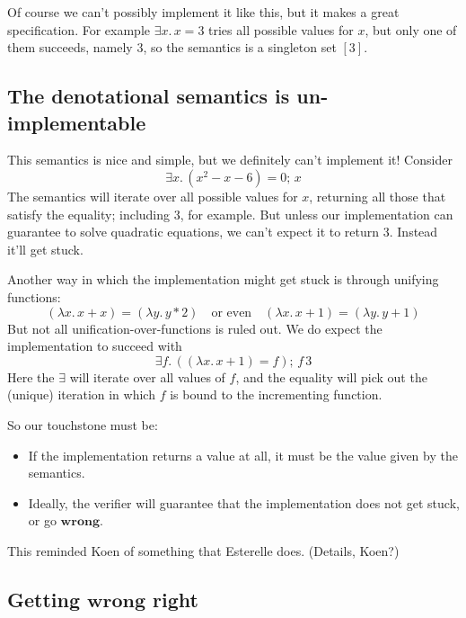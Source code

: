 \documentclass[acmsmall,review,dvipsnames]{acmart}
\newcommand{\Varid}[1]{\mathit{#1}}
\newcommand{\wrong}{\mathbf{wrong}}
\begin{document}
Of course we can't possibly implement it like this, but it makes a great specification.
For example \ensuremath{\exists\Varid{x}.\,\Varid{x}\mathrel{=}\mathrm{3}} tries all possible values for \ensuremath{\Varid{x}}, but only one of them succeeds, namely \ensuremath{\mathrm{3}}, so
the semantics is a singleton set $[3]$.

\subsection{The denotational semantics is un-implementable}

This semantics is nice and simple, but we definitely can't implement it!  Consider
$$
\ensuremath{\exists\Varid{x}.\,(\Varid{x}^2\mathbin{-}\Varid{x}\mathbin{-}\mathrm{6})\mathrel{=}\mathrm{0};\,\Varid{x}}
$$
The semantics will iterate over all possible values for \ensuremath{\Varid{x}}, returning all those that satisfy the equality;
including $3$, for example. But unless our implementation can guarantee to solve quadratic equations,
we can't expect it to return 3.  Instead it'll get stuck.

Another way in which the implementation might get stuck is through unifying functions:
$$
\ensuremath{(\lambda\Varid{x}.\,\Varid{x}\mathbin{+}\Varid{x})\mathrel{=}(\lambda\Varid{y}.\,\Varid{y}\mathbin{*}\mathrm{2})}
\quad \text{or even} \quad
\ensuremath{(\lambda\Varid{x}.\,\Varid{x}\mathbin{+}\mathrm{1})\mathrel{=}(\lambda\Varid{y}.\,\Varid{y}\mathbin{+}\mathrm{1})}
$$
But not all unification-over-functions is ruled out.  We do expect the implementation to succeed with
$$
\ensuremath{\exists\Varid{f}.\,((\lambda\Varid{x}.\,\Varid{x}\mathbin{+}\mathrm{1})\mathrel{=}\Varid{f});\,\Varid{f}\,\mathrm{3}}
$$
Here the \ensuremath{\exists{}} will iterate over all values of \ensuremath{\Varid{f}}, and the equality will pick out the (unique) iteration
in which \ensuremath{\Varid{f}} is bound to the incrementing function.

So our touchstone must be:
\begin{itemize}
\item If the implementation returns a value at all, it must be the value given by the semantics.
\item Ideally, the verifier will guarantee that the implementation does not get stuck, or go $\wrong$.
\end{itemize}

This reminded Koen of something that Esterelle does.  (Details, Koen?)

\subsection{Getting $\wrong$ right}
\end{document}
